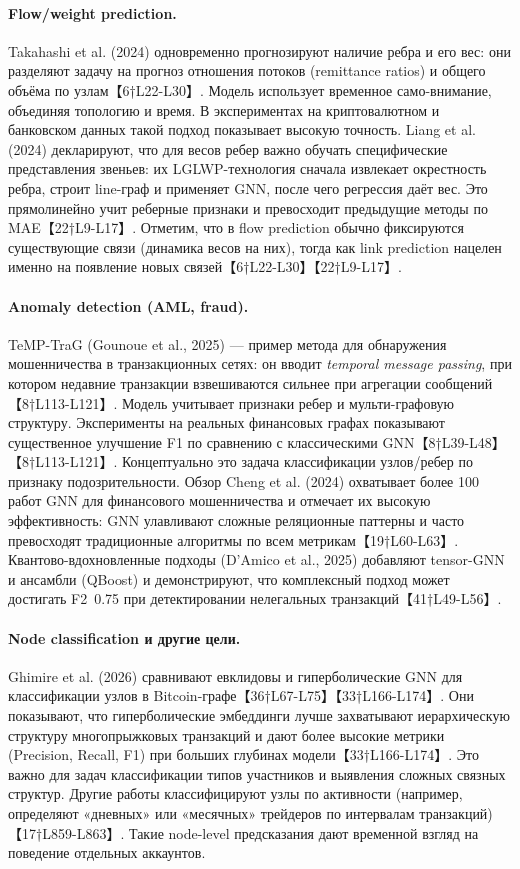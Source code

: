 \paragraph{Flow/weight prediction.} Takahashi et al. (2024) одновременно прогнозируют наличие ребра и его вес: они разделяют задачу на прогноз отношения потоков (remittance ratios) и общего объёма по узлам【6†L22-L30】. Модель использует временное само-внимание, объединяя топологию и время. В экспериментах на криптовалютном и банковском данных такой подход показывает высокую точность. Liang et al. (2024) декларируют, что для весов ребер важно обучать специфические представления звеньев: их LGLWP-технология сначала извлекает окрестность ребра, строит line-граф и применяет GNN, после чего регрессия даёт вес. Это прямолинейно учит реберные признаки и превосходит предыдущие методы по MAE【22†L9-L17】. Отметим, что в flow prediction обычно фиксируются существующие связи (динамика весов на них), тогда как link prediction нацелен именно на появление новых связей【6†L22-L30】【22†L9-L17】. 

\paragraph{Anomaly detection (AML, fraud).} TeMP-TraG (Gounoue et al., 2025) — пример метода для обнаружения мошенничества в транзакционных сетях: он вводит \emph{temporal message passing}, при котором недавние транзакции взвешиваются сильнее при агрегации сообщений【8†L113-L121】. Модель учитывает признаки ребер и мульти-графовую структуру. Эксперименты на реальных финансовых графах показывают существенное улучшение F1 по сравнению с классическими GNN【8†L39-L48】【8†L113-L121】. Концептуально это задача классификации узлов/ребер по признаку подозрительности. Обзор Cheng et al. (2024) охватывает более 100 работ GNN для финансового мошенничества и отмечает их высокую эффективность: GNN улавливают сложные реляционные паттерны и часто превосходят традиционные алгоритмы по всем метрикам【19†L60-L63】. Квантово-вдохновленные подходы (D’Amico et al., 2025) добавляют tensor-GNN и ансамбли (QBoost) и демонстрируют, что комплексный подход может достигать F2~0.75 при детектировании нелегальных транзакций【41†L49-L56】. 

\paragraph{Node classification и другие цели.} Ghimire et al. (2026) сравнивают евклидовы и гиперболические GNN для классификации узлов в Bitcoin-графе【36†L67-L75】【33†L166-L174】. Они показывают, что гиперболические эмбеддинги лучше захватывают иерархическую структуру многопрыжковых транзакций и дают более высокие метрики (Precision, Recall, F1) при больших глубинах модели【33†L166-L174】. Это важно для задач классификации типов участников и выявления сложных связных структур. Другие работы классифицируют узлы по активности (например, определяют «дневных» или «месячных» трейдеров по интервалам транзакций)【17†L859-L863】. Такие node-level предсказания дают временной взгляд на поведение отдельных аккаунтов.

